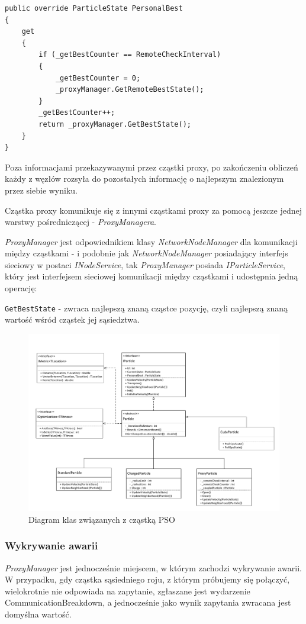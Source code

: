 \documentclass[12pt, twoside, openany, abstract=on]{report}
\theoremstyle{definition}
\begin{document}
\begin{lstlisting}[frame=single]
public override ParticleState PersonalBest
{
	get
	{
		if (_getBestCounter == RemoteCheckInterval)
		{
			_getBestCounter = 0;
			_proxyManager.GetRemoteBestState();
		}
		_getBestCounter++;
		return _proxyManager.GetBestState();
	}
}
\end{lstlisting}


Poza informacjami przekazywanymi przez cząstki proxy, po zakończeniu obliczeń każdy z węzłów rozsyła do pozostałych informację o najlepszym znalezionym przez siebie wyniku.

Cząstka proxy komunikuje się z innymi cząstkami proxy za pomocą jeszcze jednej warstwy pośredniczącej - \textit{ProxyManagera}.

\textit{ProxyManager} jest odpowiednikiem klasy \textit{NetworkNodeManager} dla komunikacji między cząstkami - i podobnie jak \textit{NetworkNodeManager} posiadający interfejs sieciowy w postaci \textit{INodeService}, tak \textit{ProxyManager} posiada \textit{IParticleService}, który jest interfejsem sieciowej komunikacji między cząstkami i udostępnia jedną operację:

\texttt{GetBestState} - zwraca najlepszą znaną cząstce pozycję, czyli najlepszą znaną wartość wśród cząstek jej sąsiedztwa.

\begin{figure}[H]
    \centering
    \includegraphics[scale=0.65]{particleDiagram.pdf} 
 \caption{Diagram klas związanych z cząstką PSO}
\end{figure}

\subsubsection{Wykrywanie awarii}
\textit{ProxyManager} jest jednocześnie miejscem, w którym zachodzi wykrywanie awarii. W przypadku, gdy cząstka sąsiedniego roju, z którym próbujemy się połączyć, wielokrotnie nie odpowiada na zapytanie, zgłaszane jest wydarzenie CommunicationBreakdown, a jednocześnie jako wynik zapytania zwracana jest domyślna wartość.
\end{document}
